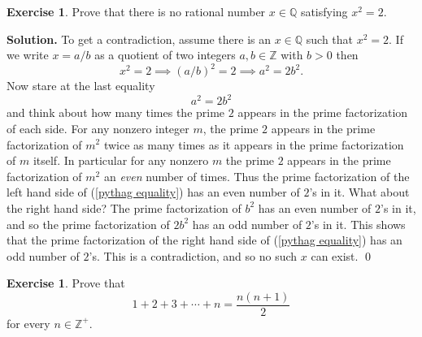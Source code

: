 \documentclass[10pt]{article}
\newcommand{\Z}{\mathbb Z}
\newcommand{\Q}{\mathbb Q}
\theoremstyle{definition}
\theoremstyle{remark}
\theoremstyle{definition}
\newtheorem{Exercise}[Thm]{Exercise}
\newenvironment{Solution}{\noindent\textbf{Solution.}}{\qed}
\begin{document}
  

\author{Professor Howard}
\title{}
\date{September 8, 2010}
\maketitle

\pagestyle{plain}   %
 

\begin{Exercise}
Prove that there is no rational number $x\in\Q$ satisfying $x^2=2$.
\end{Exercise}

\begin{Solution}
To get a contradiction, assume there is an $x\in\Q$ such that $x^2=2$.  
If we write $x=a/b$ as a quotient of two integers $a,b\in \Z$ with $b>0$ then
\[
x^2 =2 \implies (a/b)^2 =2 \implies a^2 = 2b^2.
\]
Now stare at the last equality
\begin{equation}\label{pythag equality}
a^2=2b^2
\end{equation}
and think about how many times the prime $2$ appears in the  prime factorization of each side.
For any nonzero integer $m$, the prime  $2$ appears in the prime factorization of $m^2$  twice as many times
as it appears in the prime factorization of $m$ itself.  In particular for any nonzero $m$ the prime $2$ appears in the
prime factorization of $m^2$ an \emph{even} number of times.  Thus the prime factorization of the left hand side of
(\ref{pythag equality}) has an even number of $2$'s in it.  What about the right hand side?  The prime factorization of $b^2$
has an even number of $2$'s in it, and so the prime factorization of $2b^2$ has an odd number of $2$'s in it.  This 
shows that the prime factorization of the right hand side of (\ref{pythag equality}) has an odd number of $2$'s.
This is a contradiction, and so no such $x$ can exist.
\end{Solution}

\par\bigskip




\begin{Exercise}
Prove that 
\[
1+2+3+\cdots+ n = \frac{n(n+1)}{2}
\]
for every $n\in \Z^+$.
\end{Exercise}
\end{document}
